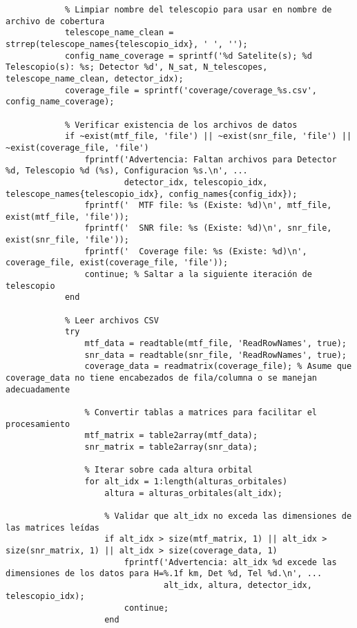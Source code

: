 \begin{verbatim}
            % Limpiar nombre del telescopio para usar en nombre de archivo de cobertura
            telescope_name_clean = strrep(telescope_names{telescopio_idx}, ' ', '');
            config_name_coverage = sprintf('%d Satelite(s); %d Telescopio(s): %s; Detector %d', N_sat, N_telescopes, telescope_name_clean, detector_idx);
            coverage_file = sprintf('coverage/coverage_%s.csv', config_name_coverage);

            % Verificar existencia de los archivos de datos
            if ~exist(mtf_file, 'file') || ~exist(snr_file, 'file') || ~exist(coverage_file, 'file')
                fprintf('Advertencia: Faltan archivos para Detector %d, Telescopio %d (%s), Configuracion %s.\n', ...
                        detector_idx, telescopio_idx, telescope_names{telescopio_idx}, config_names{config_idx});
                fprintf('  MTF file: %s (Existe: %d)\n', mtf_file, exist(mtf_file, 'file'));
                fprintf('  SNR file: %s (Existe: %d)\n', snr_file, exist(snr_file, 'file'));
                fprintf('  Coverage file: %s (Existe: %d)\n', coverage_file, exist(coverage_file, 'file'));
                continue; % Saltar a la siguiente iteración de telescopio
            end

            % Leer archivos CSV
            try
                mtf_data = readtable(mtf_file, 'ReadRowNames', true);
                snr_data = readtable(snr_file, 'ReadRowNames', true);
                coverage_data = readmatrix(coverage_file); % Asume que coverage_data no tiene encabezados de fila/columna o se manejan adecuadamente

                % Convertir tablas a matrices para facilitar el procesamiento
                mtf_matrix = table2array(mtf_data);
                snr_matrix = table2array(snr_data);

                % Iterar sobre cada altura orbital
                for alt_idx = 1:length(alturas_orbitales)
                    altura = alturas_orbitales(alt_idx);

                    % Validar que alt_idx no exceda las dimensiones de las matrices leídas
                    if alt_idx > size(mtf_matrix, 1) || alt_idx > size(snr_matrix, 1) || alt_idx > size(coverage_data, 1)
                        fprintf('Advertencia: alt_idx %d excede las dimensiones de los datos para H=%.1f km, Det %d, Tel %d.\n', ...
                                alt_idx, altura, detector_idx, telescopio_idx);
                        continue;
                    end


\end{verbatim}
